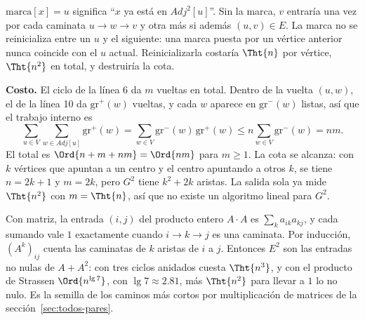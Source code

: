 \documentclass[11pt,letterpaper]{article}
\begin{document}
$\text{marca}[x] = u$ significa ``$x$ ya está en $\mathit{Adj}^2[u]$''.
Sin la marca, $v$ entraría una vez por cada caminata $u \to w \to v$ y
otra más si además $(u, v) \in E$. La marca no se reinicializa entre
un $u$ y el siguiente: una marca puesta por un vértice anterior nunca
coincide con el $u$ actual. Reinicializarla costaría $\Tht{n}$ por
vértice, $\Tht{n^2}$ en total, y destruiría la cota.

\textbf{Costo.} El ciclo de la línea 6 da $m$ vueltas en total. Dentro
de la vuelta $(u, w)$, el de la línea 10 da $\text{gr}^{+}(w)$
vueltas, y cada $w$ aparece en $\text{gr}^{-}(w)$ listas, así que el
trabajo interno es
\[
  \sum_{u \in V} \sum_{w \in \mathit{Adj}[u]} \text{gr}^{+}(w)
  = \sum_{w \in V} \text{gr}^{-}(w)\, \text{gr}^{+}(w)
  \leq n \sum_{w \in V} \text{gr}^{-}(w) = nm .
\]
El total es $\Ord{n + m + nm} = \Ord{nm}$ para $m \geq 1$. La cota se
alcanza: con $k$ vértices que apuntan a un centro y el centro
apuntando a otros $k$, se tiene $n = 2k + 1$ y $m = 2k$, pero $G^2$
tiene $k^2 + 2k$ aristas. La salida sola ya mide $\Tht{n^2}$ con
$m = \Tht{n}$, así que no existe un algoritmo lineal para $G^2$.

Con matriz, la entrada $(i, j)$ del producto entero $A \cdot A$ es
$\sum_k a_{ik} a_{kj}$, y cada sumando vale $1$ exactamente cuando
$i \to k \to j$ es una caminata. Por inducción, $(A^k)_{ij}$ cuenta
las caminatas de $k$ aristas de $i$ a $j$. Entonces $E^2$ son las
entradas no nulas de $A + A^2$: con tres ciclos anidados cuesta
$\Tht{n^3}$, y con el producto de Strassen $\Ord{n^{\lg 7}}$, con
$\lg 7 \approx 2.81$, más $\Tht{n^2}$ para llevar a $1$ lo no nulo.
Es la semilla de los caminos más cortos por multiplicación de matrices
de la sección~\ref{sec:todos-pares}.
\end{document}
